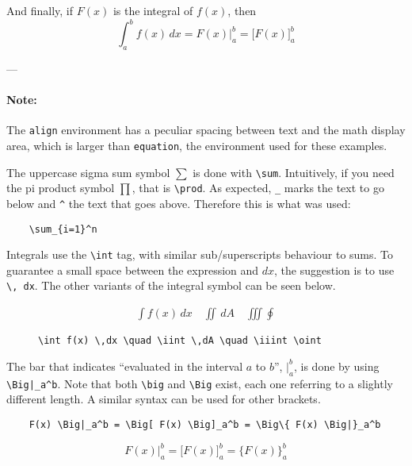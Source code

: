 And finally, if \( F(x) \) is the integral of \( f(x) \), then
\begin{equation*}
    \int_a^b f(x) \,dx = F(x)\Big|_a^b = \Big[F(x)\Big]_a^b
\end{equation*}

---

\paragraph{Note:}
The \verb|align| environment has a peculiar spacing between text and the math display area, which is larger than \verb|equation|, the environment used for these examples.

The uppercase sigma sum symbol \( \sum \) is done with \verb|\sum|.
Intuitively, if you need the pi product symbol \( \prod \), that is \verb|\prod|.
As expected, \verb|_| marks the text to go below and \verb|^| the text that goes above.
Therefore this is what was used: 
\begin{lstlisting}
    \sum_{i=1}^n
\end{lstlisting} 

Integrals use the \verb|\int| tag, with similar sub/superscripts behaviour to sums.
To guarantee a small space between the expression and \( dx \), the suggestion is to use \verb|\, dx|.
The other variants of the integral symbol can be seen below.
\begin{figure}[h]
\begin{minipage}{0.40\textwidth}
    \begin{align*}
        \int f(x) \,dx \quad \iint \,dA \quad \iiint \oint 
    \end{align*}
\end{minipage}
\hfill
\begin{minipage}{0.55\textwidth}
\begin{lstlisting}
\int f(x) \,dx \quad \iint \,dA \quad \iiint \oint 
\end{lstlisting}
\end{minipage}
\centering
\end{figure}

The bar that indicates ``evaluated in the interval \( a \) to \( b \)'', \( \Big|_a^b \), is done by using \verb!\Big|_a^b!.
Note that both \verb|\big| and \verb|\Big| exist, each one referring to a slightly different length. 
A similar syntax can be used for other brackets.
\begin{lstlisting}
    F(x) \Big|_a^b = \Big[ F(x) \Big]_a^b = \Big\{ F(x) \Big|}_a^b
\end{lstlisting}
\begin{equation*}
    F(x) \Big|_a^b = \Big[ F(x) \Big]_a^b = \Big \{ F(x) \Big \}_a^b
\end{equation*} 